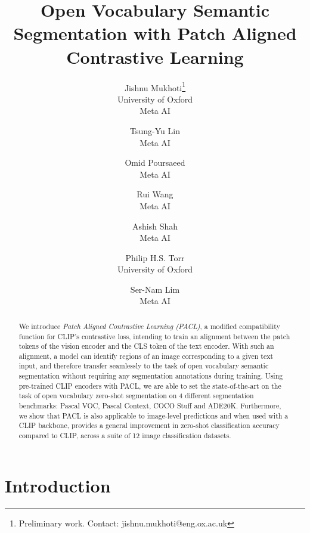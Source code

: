 \documentclass[10pt,twocolumn,letterpaper]{article}
\begin{document}
\title{Open Vocabulary Semantic Segmentation with Patch Aligned Contrastive Learning}

\author{Jishnu Mukhoti\thanks{Preliminary work. Contact: jishnu.mukhoti@eng.ox.ac.uk}\\
University of Oxford\\
Meta AI \\
\and
Tsung-Yu Lin\\
Meta AI\\
\and
Omid Poursaeed\\
Meta AI\\
\and
Rui Wang\\
Meta AI\\
\and
Ashish Shah\\
Meta AI\\
\and
Philip H.S. Torr\\
University of Oxford\\
\and
Ser-Nam Lim\\
Meta AI
}



\maketitle

\begin{abstract}
 We introduce \emph{Patch Aligned Contrastive Learning (PACL)}, a modified compatibility function for CLIP's contrastive loss, intending to train an alignment between the patch tokens of the vision encoder and the CLS token of the text encoder. With such an alignment, a model can identify regions of an image corresponding to a given text input, and therefore transfer seamlessly to the task of open vocabulary semantic segmentation without requiring any segmentation annotations during training. Using pre-trained CLIP encoders with PACL, we are able to set the state-of-the-art on the task of open vocabulary zero-shot segmentation on 4 different segmentation benchmarks: Pascal VOC, Pascal Context, COCO Stuff and ADE20K. Furthermore, we show that PACL is also applicable to image-level predictions and when used with a CLIP backbone, provides a general improvement in zero-shot classification accuracy compared to CLIP, across a suite of 12 image classification datasets.
\end{abstract}

\section{Introduction}
\label{sec:intro}
\end{document}
